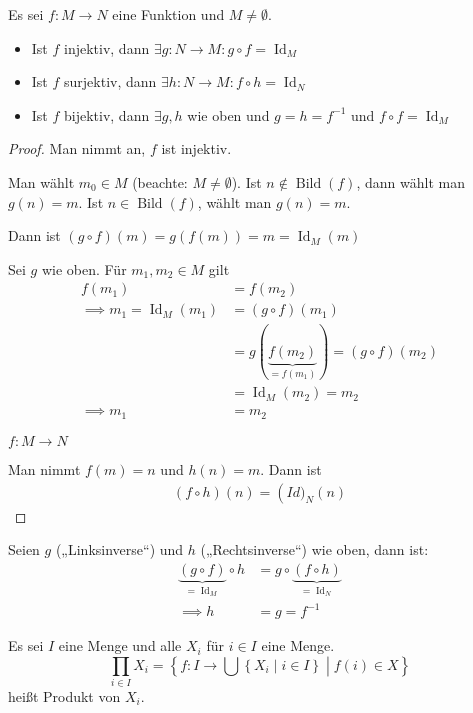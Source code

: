 \begin{theorem}
  Es sei $f: M \to N$ eine Funktion und $M \ne \emptyset$.
  \begin{itemize}
  \item Ist $f$ injektiv, dann $\exists g: N \to M: g \circ f = \operatorname{Id}_M$
  \item Ist $f$ surjektiv, dann $\exists h: N \to M: f \circ h = \operatorname{Id}_N$
  \item Ist $f$ bijektiv, dann $\exists g, h$ wie oben und $g = h = f^{-1}$ und $f \circ f = \operatorname{Id}_M$
  \end{itemize}
\end{theorem}
\begin{proof}
  Man nimmt an, $f$ ist injektiv.

  Man wählt $m_0 \in M$ (beachte: $M \ne \emptyset$). Ist $n \not\in \operatorname{Bild}(f)$, dann wählt man $g(n) = m$. Ist $n \in \operatorname{Bild}(f)$, wählt man $g(n) = m$.

  Dann ist $(g \circ f)(m) = g(f(m)) = m = \operatorname{Id}_M(m)$

  Sei $g$ wie oben. Für $m_1, m_2 \in M$ gilt
  \begin{align*}
    f(m_1) &= f(m_2) \\
    \implies m_1 = \operatorname{Id}_M(m_1) &= (g \circ f)(m_1) \\
    \, &= g(\underbrace{f(m_2)}_{= f(m_{1})}) = (g \circ f)(m_2) \\
    \, &= \operatorname{Id}_M(m_2) = m_2 \\
    \implies m_1 &= m_2
  \end{align*}

  $f: M \to N$

  Man nimmt $f(m) = n$ und $h(n) = m$. Dann ist
  \begin{align*}
    (f \circ h)(n) = \operatorname(Id)_N(n)
  \end{align*}
\end{proof}
\begin{remark}
  Seien $g$ („Linksinverse“) und $h$ („Rechtsinverse“) wie oben, dann ist:
  \begin{align*}
    \underbrace{(g \circ f)}_{= \operatorname{Id}_M} \circ h &= g \circ \underbrace{(f \circ h)}_{= \operatorname{Id}_N} \\
    \implies h &= g = f^{-1}
  \end{align*}
\end{remark}

\begin{definition}
  Es sei $I$ eine Menge und alle $X_i$ für $i \in I$ eine Menge.
  \[ \prod_{i \in I} X_i = \left\{ f: I \to \bigcup \left\{ X_i \middle| i \in I \right\} \middle| f(i) \in X \right\} \]
  heißt Produkt von $X_i$.
\end{definition}

